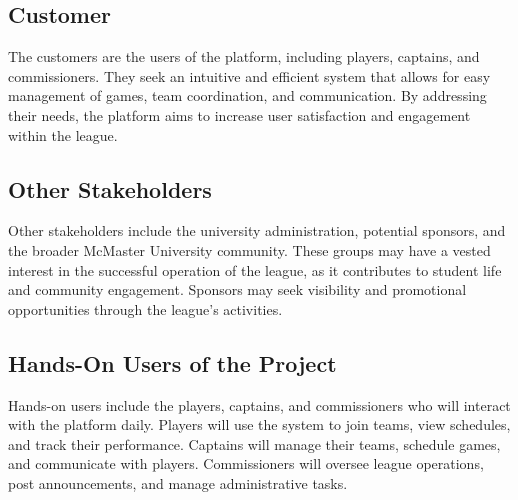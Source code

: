 \documentclass[12pt, titlepage]{article}
\begin{document}
\subsection{Customer}
The customers are the users of the platform, including players, captains, and commissioners. They seek an intuitive and efficient system that allows for easy management of games, team coordination, and communication. By addressing their needs, the platform aims to increase user satisfaction and engagement within the league.
\subsection{Other Stakeholders}
Other stakeholders include the university administration, potential sponsors, and the broader McMaster University community. These groups may have a vested interest in the successful operation of the league, as it contributes to student life and community engagement. Sponsors may seek visibility and promotional opportunities through the league's activities.
\subsection{Hands-On Users of the Project}
Hands-on users include the players, captains, and commissioners who will interact with the platform daily. Players will use the system to join teams, view schedules, and track their performance. Captains will manage their teams, schedule games, and communicate with players. Commissioners will oversee league operations, post announcements, and manage administrative tasks.
\end{document}
